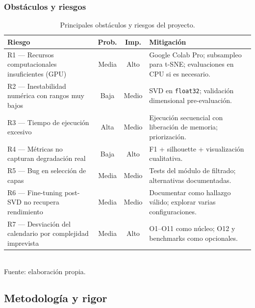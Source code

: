 \subsubsection{Obstáculos y riesgos}

\begin{table}[H]
    \centering
    \caption{Principales obstáculos y riesgos del proyecto.}
    \label{tab:gep-riesgos}
    \small
    \begin{tabular}{@{}p{3.8cm} c c p{5.5cm}@{}}
        \toprule
        \textbf{Riesgo} & \textbf{Prob.} & \textbf{Imp.} & \textbf{Mitigación} \\
        \midrule
        R1 --- Recursos computacionales insuficientes (GPU)
        & Media & Alto
        & Google Colab Pro; subsampleo para t-SNE; evaluaciones en CPU si es necesario. \\[0.2cm]
        R2 --- Inestabilidad numérica con rangos muy bajos
        & Baja & Medio
        & SVD en \texttt{float32}; validación dimensional pre-evaluación. \\[0.2cm]
        R3 --- Tiempo de ejecución excesivo
        & Alta & Medio
        & Ejecución secuencial con liberación de memoria; priorización. \\[0.2cm]
        R4 --- Métricas no capturan degradación real
        & Baja & Alto
        & F1 + silhouette + visualización cualitativa. \\[0.2cm]
        R5 --- Bug en selección de capas
        & Media & Medio
        & Tests del módulo de filtrado; alternativas documentadas. \\[0.2cm]
        R6 --- Fine-tuning post-SVD no recupera rendimiento
        & Media & Medio
        & Documentar como hallazgo válido; explorar varias configuraciones. \\[0.2cm]
        R7 --- Desviación del calendario por complejidad imprevista
        & Media & Alto
        & O1--O11 como núcleo; O12 y benchmarks como opcionales. \\
        \bottomrule
    \end{tabular}
    \\[0.15cm]{\small Fuente: elaboración propia.}
\end{table}


\subsection{Metodología y rigor}
\label{sec:gep-metodologia}

